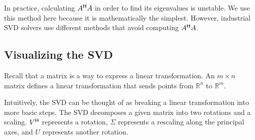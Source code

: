 \begin{info}
In practice, calculating $A^{\mathsf H} A$ in order to find its eigenvalues is unstable.
We use this method here because it is mathematically the simplest.
However, industrial SVD solvers use different methods that avoid computing $A^{\mathsf H} A$.
\end{info}

\subsection*{Visualizing the SVD}
Recall that a matrix is a way to express a linear transformation.
An $m\times n$ matrix defines a linear transformation that sends points from $\mathbb{R}^n$ to $\mathbb{R}^m$.

Intuitively, the SVD can be thought of as breaking a linear transformation into more basic steps.
The SVD decomposes a given matrix into two rotations and a scaling.
$V^{\mathsf H}$ represents a rotation, $\Sigma$ represents a rescaling along the principal axes, and $U$ represents another rotation.


